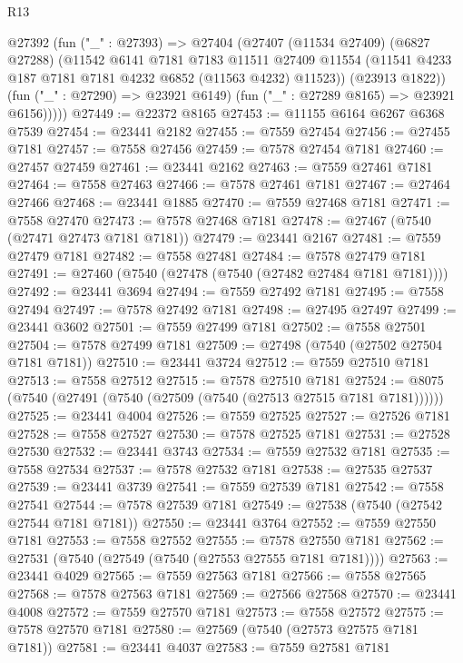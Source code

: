 \begin{lexlean}{R13}
\begin{coremodule}
        @27392
          (fun ("_" : @27393) =>
          @27404
            (@27407
              (@11534 @27409)
              (@6827 @27288)
              (@11542
                @6141
                @7181
                @7183
                @11511
                @27409
                @11554
                (@11541 @4233 @187 @7181 @7181 @4232 @6852 (@11563 @4232) @11523))
              (@23913 @1822))
            (fun ("_" : @27290) => @23921 @6149)
            (fun ("_" : @27289 @8165) => @23921 @6156)))))
@27449 := @22372 @8165
@27453 := @11155 @6164 @6267 @6368 @7539
@27454 := @23441 @2182
@27455 := @7559 @27454
@27456 := @27455 @7181
@27457 := @7558 @27456
@27459 := @7578 @27454 @7181
@27460 := @27457 @27459
@27461 := @23441 @2162
@27463 := @7559 @27461 @7181
@27464 := @7558 @27463
@27466 := @7578 @27461 @7181
@27467 := @27464 @27466
@27468 := @23441 @1885
@27470 := @7559 @27468 @7181
@27471 := @7558 @27470
@27473 := @7578 @27468 @7181
@27478 := @27467 (@7540 (@27471 @27473 @7181 @7181))
@27479 := @23441 @2167
@27481 := @7559 @27479 @7181
@27482 := @7558 @27481
@27484 := @7578 @27479 @7181
@27491 := @27460 (@7540 (@27478 (@7540 (@27482 @27484 @7181 @7181))))
@27492 := @23441 @3694
@27494 := @7559 @27492 @7181
@27495 := @7558 @27494
@27497 := @7578 @27492 @7181
@27498 := @27495 @27497
@27499 := @23441 @3602
@27501 := @7559 @27499 @7181
@27502 := @7558 @27501
@27504 := @7578 @27499 @7181
@27509 := @27498 (@7540 (@27502 @27504 @7181 @7181))
@27510 := @23441 @3724
@27512 := @7559 @27510 @7181
@27513 := @7558 @27512
@27515 := @7578 @27510 @7181
@27524 := @8075 (@7540 (@27491 (@7540 (@27509 (@7540 (@27513 @27515 @7181 @7181))))))
@27525 := @23441 @4004
@27526 := @7559 @27525
@27527 := @27526 @7181
@27528 := @7558 @27527
@27530 := @7578 @27525 @7181
@27531 := @27528 @27530
@27532 := @23441 @3743
@27534 := @7559 @27532 @7181
@27535 := @7558 @27534
@27537 := @7578 @27532 @7181
@27538 := @27535 @27537
@27539 := @23441 @3739
@27541 := @7559 @27539 @7181
@27542 := @7558 @27541
@27544 := @7578 @27539 @7181
@27549 := @27538 (@7540 (@27542 @27544 @7181 @7181))
@27550 := @23441 @3764
@27552 := @7559 @27550 @7181
@27553 := @7558 @27552
@27555 := @7578 @27550 @7181
@27562 := @27531 (@7540 (@27549 (@7540 (@27553 @27555 @7181 @7181))))
@27563 := @23441 @4029
@27565 := @7559 @27563 @7181
@27566 := @7558 @27565
@27568 := @7578 @27563 @7181
@27569 := @27566 @27568
@27570 := @23441 @4008
@27572 := @7559 @27570 @7181
@27573 := @7558 @27572
@27575 := @7578 @27570 @7181
@27580 := @27569 (@7540 (@27573 @27575 @7181 @7181))
@27581 := @23441 @4037
@27583 := @7559 @27581 @7181

\end{coremodule}
\end{lexlean}
